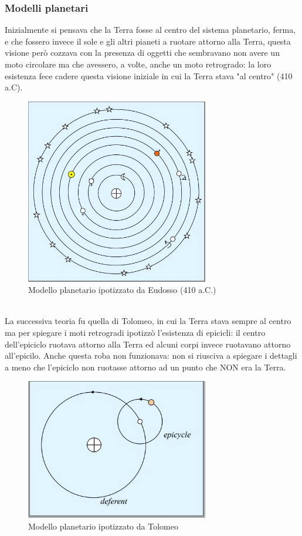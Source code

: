 \documentclass[a4paper,11pt]{article}
\begin{document}
    \subsubsection{Modelli planetari}
        Inizialmente si pensava che la Terra fosse al centro del sistema planetario, ferma, e che fossero invece il sole e gli altri pianeti a ruotare attorno alla Terra, questa visione però cozzava con la presenza di oggetti che sembravano non avere un moto circolare ma che avessero, a volte, anche un moto retrogrado: la loro esistenza fece cadere questa visione iniziale in cui la Terra stava "al centro" (410 a.C).
        \\
        \begin{figure}[h!!]
            \centering
                \includegraphics[width=8cm]{2dic/Modello_Planetario_Eudosso.jpg}
                \caption{Modello planetario ipotizzato da Eudosso (410 a.C.)}
            \label{fig:MPE}
        \end{figure}
        \\
        La successiva teoria fu quella di Tolomeo, in cui la Terra stava sempre al centro ma per spiegare i moti retrogradi ipotizzò l'esistenza di epicicli: il centro dell'epiciclo ruotava attorno alla Terra ed alcuni corpi invece ruotavano attorno all'epicilo. Anche questa roba non funzionava: non si riusciva a spiegare i dettagli a meno che l'epiciclo non ruotasse attorno ad un punto che NON era la Terra.
        \\
        \begin{figure}[h!!]
            \centering
                \includegraphics[width=8cm]{2dic/Modello_Planetario_Tolomeo.jpg}
                \caption{Modello planetario ipotizzato da Tolomeo}
            \label{fig:MPT}
        \end{figure}
\end{document}
